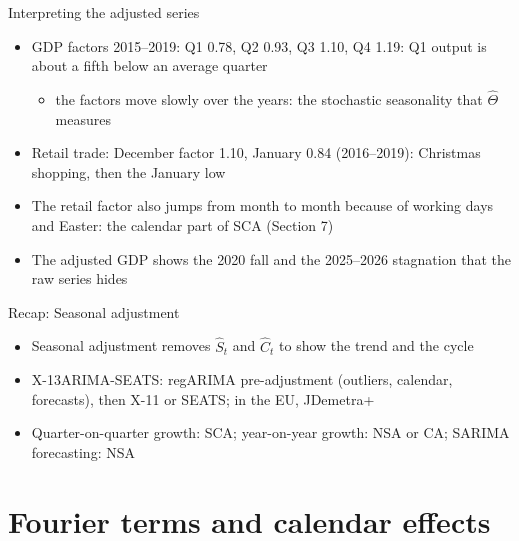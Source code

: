 \begin{frame}{Interpreting the adjusted series}
\itemsize{\footnotesize}
\begin{itemize}
    \item GDP factors 2015--2019: Q1 0.78, Q2 0.93, Q3 1.10, Q4 1.19: Q1 output is about a fifth below an average quarter
    \begin{itemize}
        \item the factors move slowly over the years: the stochastic seasonality that $\hat\Theta$ measures
    \end{itemize}
    \item Retail trade: December factor 1.10, January 0.84 (2016--2019): Christmas shopping, then the January low
    \item The retail factor also jumps from month to month because of working days and Easter: the calendar part of SCA (Section 7)
    \item The adjusted GDP shows the 2020 fall and the 2025--2026 stagnation that the raw series hides
\end{itemize}
\end{frame}

\begin{frame}{Recap: Seasonal adjustment}
\itemsize{\small}
\begin{itemize}
    \item Seasonal adjustment removes $\hat S_t$ and $\hat C_t$ to show the trend and the cycle
    \item X-13ARIMA-SEATS: regARIMA pre-adjustment (outliers, calendar, forecasts), then X-11 or SEATS; in the EU, JDemetra+
    \item Quarter-on-quarter growth: SCA; year-on-year growth: NSA or CA; SARIMA forecasting: NSA
\end{itemize}
\end{frame}


\section{Fourier terms and calendar effects}

